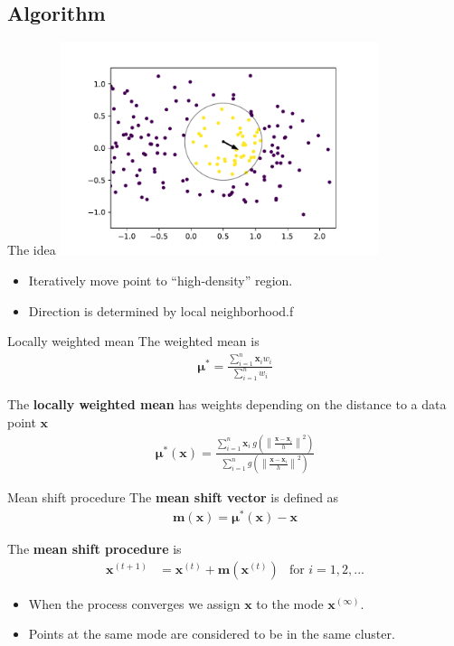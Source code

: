 \documentclass[18pt]{beamer}
\newcommand{\norm}[1]{\left\lVert#1\right\rVert}
\begin{document}
\subsection{Algorithm}
	
\begin{frame}{The idea}
	\centering
	\includegraphics[width=0.7\textwidth]{figures/mean_shift_vector}
	\begin{itemize}
		\item Iteratively move point to ``high-density'' region.
		\item Direction is determined by local neighborhood.f
	\end{itemize}
\end{frame}



\begin{frame}{Locally weighted mean}
	The weighted mean is
	\begin{align*}
		\bm{\mu}^* = \frac{\sum_{i=1}^n \bm{x}_i w_i}{\sum_{i=1}^n w_i}
	\end{align*}
	\vspace*{10mm}
	
	The \textbf{locally weighted mean} has weights depending on the distance to a data point $\bm{x}$
	\begin{align*}
		\bm{\mu}^*(\bm{x}) = \frac{\sum_{i=1}^n \bm{x}_i\ g\left(\norm{\frac{\bm{x} - \bm{x}_i}{h}}^2 \right)}{\sum_{i=1}^n g\left(\norm{\frac{\bm{x} - \bm{x}_i}{h}}^2 \right)}
	\end{align*}
\end{frame}

\begin{frame}{Mean shift procedure}
	The \textbf{mean shift vector} is defined as
	\begin{align*}
		\bm{m}\left(\bm{x}\right) = \bm{\mu}^*(\bm{x}) - \bm{x}
	\end{align*}
	
	The \textbf{mean shift procedure} is
	\begin{align*}
		\bm{x}^{(t+1)} &= \bm{x}^{(t)} + \bm{m}\left(\bm{x}^{(t)}\right) & \text{for } i = 1, 2, ...
	\end{align*}
	
	\vspace*{5mm}
	\begin{itemize}
		\item When the process converges we assign $\bm{x}$ to the mode $\bm{x}^{(\infty)}$.
		\item Points at the same mode are considered to be in the same cluster.
	\end{itemize}
\end{frame}
\end{document}
